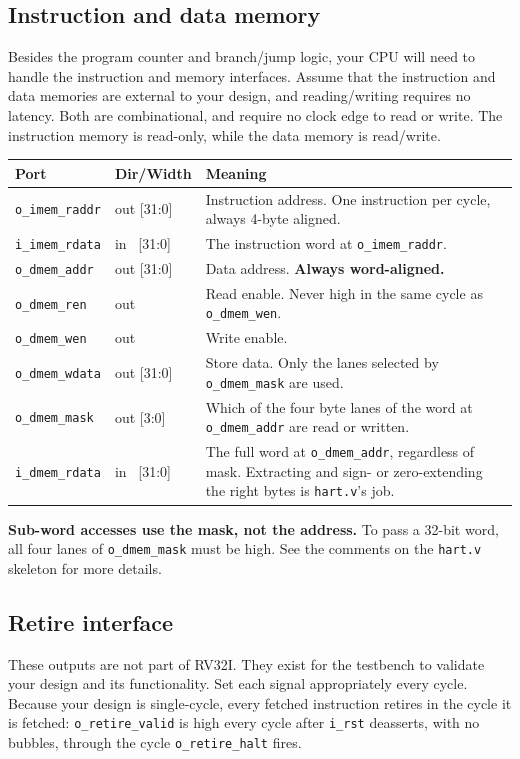 \documentclass[11pt]{article}
\begin{document}
\subsection{Instruction and data memory}
Besides the program counter and branch/jump logic, your CPU will need to handle the instruction and memory interfaces. Assume that the instruction and data memories are external to your design, and reading/writing requires no latency. Both are combinational, and require no clock edge to read or write. The instruction memory is read-only, while the data memory is read/write.

\begin{center}
\begin{tabular}{@{}llp{9.0cm}@{}}
\toprule
\textbf{Port} & \textbf{Dir/Width} & \textbf{Meaning} \\
\midrule
\texttt{o\_imem\_raddr} & out [31:0] & Instruction address. One instruction per cycle, always 4-byte aligned. \\
\texttt{i\_imem\_rdata} & in \ [31:0] & The instruction word at \texttt{o\_imem\_raddr}. \\
\texttt{o\_dmem\_addr}  & out [31:0] & Data address. \textbf{Always word-aligned.} \\
\texttt{o\_dmem\_ren}   & out        & Read enable. Never high in the same cycle as \texttt{o\_dmem\_wen}. \\
\texttt{o\_dmem\_wen}   & out        & Write enable. \\
\texttt{o\_dmem\_wdata} & out [31:0] & Store data. Only the lanes selected by \texttt{o\_dmem\_mask} are used. \\
\texttt{o\_dmem\_mask}  & out [3:0]  & Which of the four byte lanes of the word at \texttt{o\_dmem\_addr} are read or written. \\
\texttt{i\_dmem\_rdata} & in \ [31:0] & The full word at \texttt{o\_dmem\_addr}, regardless of mask. Extracting and sign- or zero-extending the right bytes is \texttt{hart.v}'s job. \\
\bottomrule
\end{tabular}
\end{center}

\begin{clarification}
\textbf{Sub-word accesses use the mask, not the address.} To pass a 32-bit word, all four lanes of \texttt{o\_dmem\_mask} must be high. See the comments on the \texttt{hart.v} skeleton for more details.
\end{clarification}

\subsection{Retire interface}
\label{sec:retire}
These outputs are not part of RV32I. They exist for the testbench to validate your design and its functionality. Set each signal appropriately every cycle. Because your design
is single-cycle, every fetched instruction retires in the cycle it is fetched:
\texttt{o\_retire\_valid} is high every cycle after \texttt{i\_rst} deasserts,
with no bubbles, through the cycle \texttt{o\_retire\_halt} fires.
\end{document}
